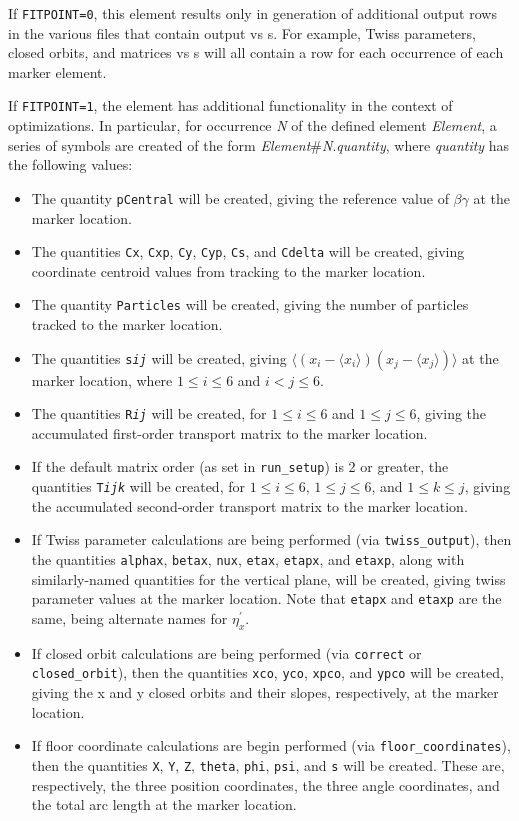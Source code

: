 If {\tt FITPOINT=0}, this element results only in generation of additional output rows in the various 
files that contain output vs s.  For example, Twiss parameters, closed orbits, and matrices vs s will
all contain a row for each occurrence of  each marker element.

If {\tt FITPOINT=1}, the element has additional functionality in the context of optimizations.  In particular,
for occurrence {\em N} of the defined element {\em Element}, a series of symbols are created of the
form {\em Element}\#{\em N}.{\em quantity}, where {\em quantity} has the following values:
\begin{itemize}
\item The quantity {\tt pCentral} will be created, giving the reference value of $\beta\gamma$ at the marker location.
\item The quantities {\tt Cx}, {\tt Cxp}, {\tt Cy}, {\tt Cyp}, {\tt Cs}, and {\tt Cdelta} will be created,
 giving coordinate centroid values from tracking to the marker location.
\item The quantity {\tt Particles} will be created, giving the number of particles tracked to the marker location.
\item The quantities {\tt s{\em i}{\em j}} will be created, giving $\langle ( x_i -\langle x_i\rangle)( x_j - \langle x_j \rangle)\rangle$
 at the marker location, where $1\leq i\leq 6$ and $i<j\leq 6$.
\item The quantities {\tt R{\em i}{\em j}} will be created, for $1\leq i \leq 6$ and $1\leq j \leq 6$,
  giving the accumulated first-order transport matrix to the marker location.
\item If the default matrix order (as set in {\tt run\_setup}) is 2 or greater, the quantities {\tt T{\em i}{\em j}{\em k}} 
  will be created, for $1\leq i \leq 6$, $1\leq j \leq 6$, and $1\leq k \leq j$,
  giving the accumulated second-order transport matrix to the marker location.
\item If Twiss parameter calculations are being performed (via {\tt twiss\_output}), then the quantities
  {\tt alphax}, {\tt betax}, {\tt nux}, {\tt etax}, {\tt etapx}, and {\tt etaxp}, along with similarly-named
  quantities for the vertical plane, will be created, giving twiss parameter values at the marker location.
  Note that {\tt etapx} and {\tt etaxp} are the same, being alternate names for $\eta_x^\prime$.
\item If closed orbit calculations are being performed (via {\tt correct} or {\tt closed\_orbit}), then
  the quantities {\tt xco}, {\tt yco}, {\tt xpco}, and {\tt ypco} will be created, giving the
  x and y closed orbits and their slopes, respectively, at the marker location.
\item If floor coordinate calculations are begin performed (via {\tt floor\_coordinates}), then the quantities
  {\tt X}, {\tt Y}, {\tt Z}, {\tt theta}, {\tt phi}, {\tt psi}, and {\tt s} will be created.  These are,
  respectively, the three position coordinates, the three angle coordinates, and the total arc length
  at the marker location.
\end{itemize}
